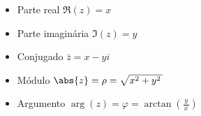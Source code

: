 \begin{itemize}
  \item Parte real       \tabto{32mm} \( \Re(z) = x \)     \\[4mm]
  \item Parte imaginária \tabto{32mm} \( \Im(z) = y \)     \\[4mm]
  \item Conjugado        \tabto{32mm} \( \bar{z} = x - yi \)        \\[4mm]
  \item Módulo           \tabto{32mm} \( \abs{z} = \rho = \sqrt{x^2+y^2\,}\) \\[4mm]
  \item Argumento        \tabto{32mm} \( \arg{(z)} = \varphi = \arctan\left(\frac{\,y\,}{x}\right)\)
\end{itemize}

%

